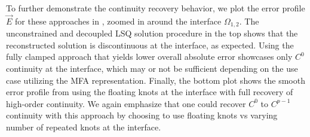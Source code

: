 

To further demonstrate the continuity recovery behavior, we plot the error profile $\vec{E}$ for these approaches in , zoomed in around the interface $\Omega_{1,2}$. The unconstrained and decoupled LSQ solution procedure in the top shows that the reconstructed solution is discontinuous at the interface, as expected. Using the fully clamped approach that yields lower overall absolute error showcases only $C^0$ continuity at the interface, which may or not be sufficient depending on the use case utilizing the MFA representation. Finally, the bottom plot shows the smooth error profile from using the floating knots at the interface with full recovery of high-order continuity. We again emphasize that one could recover $C^0$ to $C^{p-1}$ continuity with this approach by choosing to use floating knots vs varying number of repeated knots at the interface.


